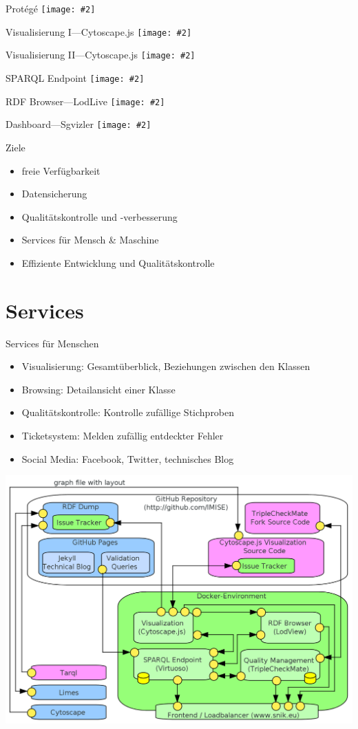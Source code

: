 \documentclass{beamer}
\newcommand{\imageslide}[2]
{
\begin{frame}{#1}
\centering\texttt{[image: \#2]}
\end{frame}
}
\begin{document}
\imageslide{Protégé}{img/protege.png}
\imageslide{Visualisierung I---Cytoscape.js}{img/graph-entitytype.png}
\imageslide{Visualisierung II---Cytoscape.js}{img/graph-erf.png}
\imageslide{SPARQL Endpoint}{img/sparqlresult.png}
\imageslide{RDF Browser---LodLive}{img/browse-cio.png}
\imageslide{Dashboard---Sgvizler}{img/dashboard-medley.png}


\begin{frame}{Ziele}
\begin{itemize}
\item freie Verfügbarkeit
\item Datensicherung
\item Qualitätskontrolle und -verbesserung
\pause
\item Services für Mensch \& Maschine
\item Effiziente Entwicklung und Qualitätskontrolle
\end{itemize}
\end{frame}

\section{Services}
\begin{frame}{Services für Menschen}
\begin{itemize}
\item Visualisierung: Gesamtüberblick, Beziehungen zwischen den Klassen
\item Browsing: Detailansicht einer Klasse
\item Qualitätskontrolle: Kontrolle zufällige Stichproben
\item Ticketsystem: Melden zufällig entdeckter Fehler 
\item Social Media: Facebook, Twitter, technisches Blog
\end{itemize}
\end{frame}

\begin{frame}
\includegraphics[width=\textwidth]{img/architecture.png}
\end{frame}
\end{document}
